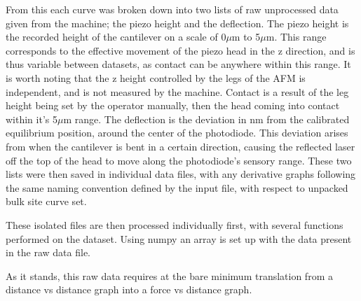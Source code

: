 From this each curve was broken down into two lists of raw unprocessed data given from the machine; the piezo height and the deflection. The piezo height is the recorded height of the cantilever on a scale of 0$\mu$m to 5$\mu$m. This range corresponds to the effective movement of the piezo head in the z direction, and is thus variable between datasets, as contact can be anywhere within this range. It is worth noting that the z height controlled by the legs of the AFM is independent, and is not measured by the machine. Contact is a result of the leg height being set by the operator manually, then the head coming into contact within it's 5$\mu$m range. The deflection is the deviation in nm from the calibrated equilibrium position, around the center of the photodiode. This deviation arises from when the cantilever is bent in a certain direction, causing the reflected laser off the top of the head to move along the photodiode's sensory range. These two lists were then saved in individual data files, with any derivative graphs following the same naming convention defined by the input file, with respect to unpacked bulk site curve set. 









These isolated files are then processed individually first, with several functions performed on the dataset. Using numpy an array is set up with the data present in the raw data file.

As it stands, this raw data requires at the bare minimum translation from a distance vs distance graph into a force vs distance graph.

